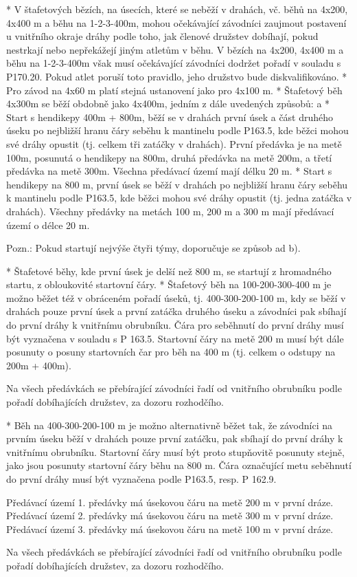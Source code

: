 * V štafetových bězích, na úsecích, které se neběží v drahách, vč. běhů na 4x200, 4x400 m a běhu na 1-2-3-400m, mohou očekávající závodníci zaujmout postavení u vnitřního okraje dráhy podle toho, jak členové družstev dobíhají, pokud nestrkají nebo nepřekážejí jiným atletům v běhu. V bězích na 4x200, 4x400 m a běhu na 1-2-3-400m však musí očekávající závodníci dodržet pořadí v souladu s P170.20. Pokud atlet poruší toto pravidlo, jeho družstvo bude diskvalifikováno.
* Pro závod na 4x60 m platí stejná ustanovení jako pro 4x100 m.
* Štafetový běh 4x300m se běží obdobně jako 4x400m, jedním z dále uvedených způsobů:
  \begitems \style a
  * Start s hendikepy 400m + 800m, běží se v drahách první úsek a část druhého úseku po nejbližší hranu čáry seběhu k mantinelu podle P163.5, kde běžci mohou své dráhy opustit (tj. celkem tři zatáčky v drahách). První předávka je na metě 100m, posunutá o hendikepy na 800m, druhá předávka na metě 200m, a třetí předávka na metě 300m. Všechna předávací území mají délku 20 m.
  * Start s hendikepy na 800 m, první úsek se běží v drahách po nejbližší hranu čáry seběhu k mantinelu podle P163.5, kde běžci mohou své dráhy opustit (tj. jedna zatáčka v drahách). Všechny předávky na metách 100 m, 200 m a 300 m mají předávací území o délce 20 m.
  \enditems

Pozn.: Pokud startují nejvýše čtyři týmy, doporučuje se způsob ad b).

* Štafetové běhy, kde první úsek je delší než 800 m, se startují z hromadného startu, z obloukovité startovní čáry.
* Štafetový běh na 100-200-300-400 m je možno běžet též v obráceném pořadí úseků, tj. 400-300-200-100 m, kdy se běží v drahách pouze první úsek a první zatáčka druhého úseku a závodníci pak sbíhají do první dráhy k vnitřnímu obrubníku. Čára pro seběhnutí do první dráhy musí být vyznačena v souladu s P 163.5. Startovní čáry na metě 200 m musí být dále posunuty o posuny startovních čar pro běh na 400 m (tj. celkem o odstupy na 200m + 400m).

Na všech předávkách se přebírající závodníci řadí od vnitřního obrubníku podle pořadí dobíhajících družstev, za dozoru rozhodčího.

* Běh na 400-300-200-100 m je možno alternativně běžet tak, že závodníci na prvním úseku běží v drahách pouze první zatáčku, pak sbíhají do první dráhy k vnitřnímu obrubníku. Startovní čáry musí být proto stupňovitě posunuty stejně, jako jsou posunuty startovní čáry běhu na 800 m. Čára označující metu seběhnutí do první dráhy musí být vyznačena podle  P163.5, resp. P 162.9.

Předávací území 1. předávky má úsekovou čáru na metě 200 m v první dráze.
Předávací území 2. předávky má úsekovou čáru na metě 300 m v první dráze.
Předávací území 3. předávky má úsekovou čáru na metě 100 m v první dráze.

Na všech předávkách se přebírající závodníci řadí od vnitřního obrubníku podle pořadí dobíhajících družstev, za dozoru rozhodčího.
\enditems

\endinput